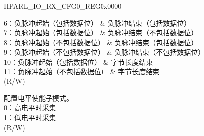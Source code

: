 \begin{register}{H}{PARL\_IO\_RX\_CFG0\_REG}{0x0000}
\begin{regdesc}
\begin{reglist}
6：负脉冲起始（包括数据位） \& 负脉冲结束（包括数据位）\\
7：负脉冲起始（包括数据位） \& 负脉冲结束（不包括数据位）\\
8：负脉冲起始（不包括数据位） \& 负脉冲结束（包括数据位）\\
9：负脉冲起始（不包括数据位） \& 负脉冲结束（不包括数据位）\\
10：负脉冲起始（包括数据位） \& 字节长度结束\\
11：负脉冲起始（不包括数据位） \& 字节长度结束\\
(R/W)
\label{fielddesc:PARLIORXLEVELSUBMODESEL}\item [PARL\_IO\_RX\_LEVEL\_SUBMODE\_SEL] 配置电平使能子模式。\\
0：高电平时采集\\
1：低电平时采集\\
(R/W)

\item [见下页...]
\end{reglist}\end{regdesc}
\end{register}
\addtocounter{Regfloat}{-1}
